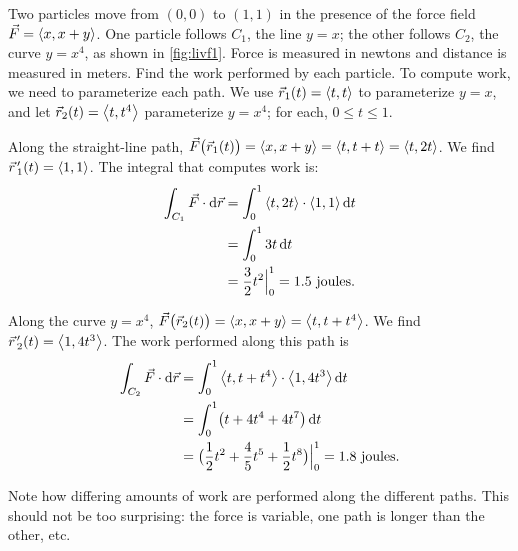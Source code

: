 \begin{example}\label{ex_livf1}%
%
%
Two particles move from $(0,0)$ to $(1,1)$ in the presence of the force field $\vec F  =\left\langle x,x+y\right\rangle$. One particle follows $C_1$, the line $y=x$; the other follows $C_2$, the curve $y=x^4$, as shown in \autoref{fig:livf1}. Force is measured in newtons and distance is measured in meters. Find the work performed by each particle.
\solution
To compute work, we need to parameterize each path. We use $\vec r_1(t) =\left\langle t,t\right\rangle$ to parameterize $y=x$, and let $\vec r_2(t) =\left\langle t,t^4\right\rangle$ parameterize $y=x^4$; for each, $0\leq t\leq 1$. 

Along the straight-line path, $\vec F\bigl(\vec r_1(t)\bigr) =\left\langle x,x+y\right\rangle=\left\langle t,t+t\right\rangle=\left\langle t,2t\right\rangle$. We find $\vec r\hskip1.25pt '_1(t) =\left\langle 1,1\right\rangle$. The integral that computes work is:
\begin{align*}
	\int_{C_1} \vec F\cdot\operatorname{d}\!\vec r
	&= \int_0^1\left\langle t,2t\right\rangle\cdot\left\langle 1,1\right\rangle\operatorname{d}\! t \\
	&= \int_0^1 3t\operatorname{d}\! t \\
	&= \frac32t^2\Big|_0^1 = 1.5 \text{ joules}.
\end{align*}

Along the curve $y = x^4$, $\vec F\bigl(\vec r_2(t)\bigr) =\left\langle x,x+y\right\rangle=\left\langle t,t+t^4\right\rangle$. We find $\vec r\hskip1.25pt '_2(t) =\left\langle 1,4t^3\right\rangle$. The work performed along this path is
\begin{align*}
	\int_{C_2} \vec F\cdot\operatorname{d}\!\vec r
	&= \int_0^1\left\langle t,t+t^4\right\rangle\cdot\left\langle 1,4t^3\right\rangle\operatorname{d}\! t\\
	&= \int_0^1 \bigl(t + 4t^4+ 4t^7\bigr)\operatorname{d}\! t \\
	&= \bigl(\frac12t^2 + \frac45t^5 + \frac12t^8\bigr)\Big|_0^1 =  1.8 \text{ joules}.
\end{align*}

Note how differing amounts of work are performed along the different paths. This should not be too surprising: the force is variable, one path is longer than the other, etc.
\end{example}

